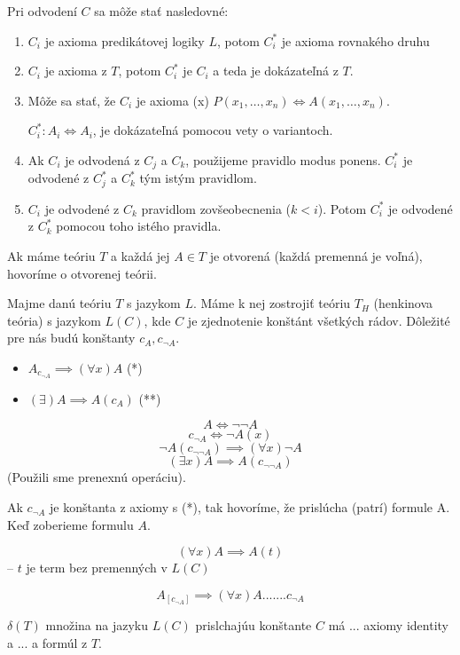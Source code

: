Pri odvodení $C$ sa môže stať nasledovné:
\begin{enumerate}
	\item $C_i$ je axioma predikátovej logiky $L$, potom $C_i^*$ je axioma
	rovnakého druhu
	\item $C_i$ je axioma z $T$, potom $C_i^*$ je $C_i$ a teda je
	dokázateľná z $T$.
	\item Môže sa stať, že $C_i$ je axioma (x) $P(x_1,  \ldots, x_n) \iff
	A(x_1, \ldots, x_n)$. \par $C_i^*: A_i \iff A_i$, je dokázateľná pomocou
	vety o variantoch.
	\item Ak $C_i$ je odvodená z $C_j$ a $C_k$, použijeme pravidlo modus
	ponens. $C_i^*$ je odvodené z $C_j^*$ a $C_k^*$ tým istým pravidlom.
	\item $C_i$ je odvodené z $C_k$ pravidlom zovšeobecnenia ($k<i$). Potom
	$C_i^*$ je odvodené z $C_k^*$ pomocou toho istého pravidla.
\end{enumerate}



Ak máme teóriu $T$ a každá jej $A \in T$ je otvorená (každá premenná je voľná),
hovoríme o otvorenej teórii.

\par Majme danú teóriu $T$ s jazykom $L$. Máme k nej zostrojiť teóriu $T_H$
(henkinova teória) s jazykom $L(C)$, kde $C$ je zjednotenie konštánt všetkých
rádov. Dôležité pre nás budú konštanty $c_A, c_{\neg A}$.

\begin{itemize}
	\item $A_{c_{\neg A}} \implies (\forall x) A$ (*)
	\item $(\exists ) A \implies A(c_A)$ (**)
\end{itemize}

$$A \iff \neg \neg A$$
$$c_{\neg A} \iff \neg A(x)$$
$$\neg A(c_{\neg\neg A}) \implies (\forall x)\neg A$$
$$(\exists x) A \implies A(c_{\neg\neg A})$$
(Použili sme prenexnú operáciu).

\par Ak $c_{\neg A}$ je konštanta z axiomy s (*), tak hovoríme, že prislúcha
(patrí) formule A. Keď zoberieme formulu $A$.

$$(\forall x) A \implies A(t)$$ -- $t$ je term bez premenných v $L(C)$

$$A_{[c_{\neg A}]} \implies (\forall x) A \mbox{.......} c_{\neg A}$$

$\delta(T)$ množina na jazyku $L(C)$ prislchajúu konštante $C$ má ... axiomy
identity a ... a formúl z $T$.


